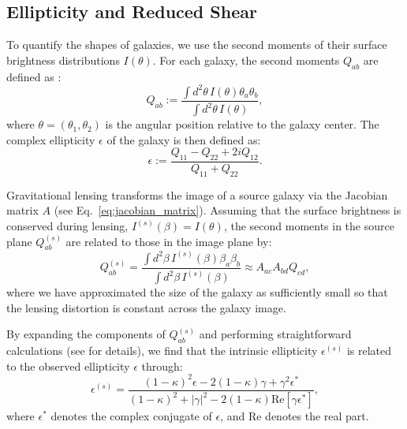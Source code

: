 \subsection{Ellipticity and Reduced Shear}
To quantify the shapes of galaxies, we use the second moments of their surface brightness distributions $I(\theta)$. For each galaxy, the second moments $Q_{ab}$ are defined as \citep{2001PhR...340..291B}:
\begin{equation}
    Q_{ab} := \frac{\int d^2\theta\, I(\theta) \theta_a \theta_b}{\int d^2\theta\, I(\theta)},
    \label{eq:second_moments}
\end{equation}
where $\theta = (\theta_1, \theta_2)$ is the angular position relative to the galaxy center. The complex ellipticity $\epsilon$ of the galaxy is then defined as:
\begin{equation}
    \epsilon := \frac{Q_{11} - Q_{22} + 2i Q_{12}}{Q_{11} + Q_{22}}.
    \label{eq:complex_ellipticity}
\end{equation}

Gravitational lensing transforms the image of a source galaxy via the Jacobian matrix $A$ (see Eq.~\eqref{eq:jacobian_matrix}). Assuming that the surface brightness is conserved during lensing, $I^{(s)}(\beta) = I(\theta)$, the second moments in the source plane $Q_{ab}^{(s)}$ are related to those in the image plane by:
\begin{equation}
    Q_{ab}^{(s)} = \frac{\int d^2\beta\, I^{(s)}(\beta) \beta_a \beta_b}{\int d^2\beta\, I^{(s)}(\beta)} \approx A_{ac} A_{bd} Q_{cd},
    \label{eq:second_moments_source}
\end{equation}
where we have approximated the size of the galaxy as sufficiently small so that the lensing distortion is constant across the galaxy image.

By expanding the components of $Q_{ab}^{(s)}$ and performing straightforward calculations (see \citealt{1992grle.book.....S} for details), we find that the intrinsic ellipticity $\epsilon^{(s)}$ is related to the observed ellipticity $\epsilon$ through:
\begin{equation}
    \epsilon^{(s)} = \frac{(1 - \kappa)^2 \epsilon - 2 (1 - \kappa) \gamma + \gamma^2 \epsilon^*}{(1 - \kappa)^2 + |\gamma|^2 - 2 (1 - \kappa) \text{Re}[\gamma \epsilon^*]},
    \label{eq:reduced_shear_ellipticity}
\end{equation}
where $\epsilon^*$ denotes the complex conjugate of $\epsilon$, and $\text{Re}$ denotes the real part.

